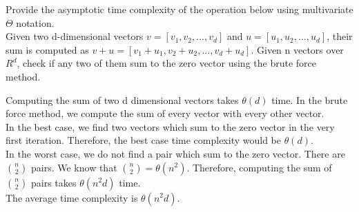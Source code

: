 \begin{prob}
    Provide the asymptotic time complexity of the operation below using multivariate $\Theta$ notation.
    \\
    Given two d-dimensional vectors $v=[v_1,v_2,...,v_d]$ and $u=[u_1,u_2,...,u_d]$, their sum is computed as $v+u=[v_1+u_1, v_2+u_2,...,v_d+u_d]$. Given n vectors over $R^d$, check if any two of them sum to the zero vector using the brute force method.

    \begin{soln} 
        Computing the sum of two d dimensional vectors takes $\theta(d)$ time. In the brute force method, we compute the sum of every vector with every other vector.
        \\
        In the best case, we find two vectors which sum to the zero vector in the very first iteration. Therefore, the best case time complexity would be $\theta(d)$.
        \\
        In the worst case, we do not find a pair which sum to the zero vector. There are ${n \choose 2}$ pairs. We know that  $\binom{n}{2}=\theta(n^2)$. Therefore, computing the sum of $\binom{n}{2}$ pairs takes $\theta(n^2d)$ time.
        \\
        The average time complexity is $\theta(n^2d)$.
    \end{soln}

\end{prob}
